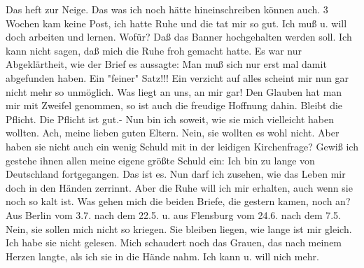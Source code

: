 \def\day{Canada, 27. August 1944}
\mktitle

Das heft zur Neige.
Das was ich noch h\"{a}tte hineinschreiben k\"{o}nnen auch.
3 Wochen kam keine Post, ich hatte Ruhe und die tat mir so gut.
Ich mu{\ss} u. will doch arbeiten und lernen.
Wof\"{u}r?
Da{\ss} das Banner hochgehalten werden soll.
Ich kann nicht sagen, da{\ss} mich die Ruhe froh gemacht hatte.
Es war nur Abgekl\"{a}rtheit, wie der Brief es aussagte: Man mu{\ss} sich nur erst mal damit abgefunden haben.
Ein "feiner" Satz!!!
Ein verzicht auf alles scheint mir nun gar nicht mehr so unm\"{o}glich.
Was liegt an uns, an mir gar!
Den Glauben hat man mir mit Zweifel genommen, so ist auch die freudige Hoffnung dahin.
Bleibt die Pflicht.
Die Pflicht ist gut.-
Nun bin ich soweit, wie sie mich vielleicht haben wollten.
Ach, meine lieben guten Eltern.
Nein, sie wollten es wohl nicht.
Aber haben sie nicht auch ein wenig Schuld mit in der leidigen Kirchenfrage?
Gewi{\ss} ich gestehe ihnen allen meine eigene gr\"{o}{\ss}te Schuld ein: Ich bin zu lange von Deutschland fortgegangen.
Das ist es.
Nun darf ich zusehen, wie das Leben mir doch in den H\"{a}nden zerrinnt.
Aber die Ruhe will ich mir erhalten, auch wenn sie noch so kalt ist.
Was gehen mich die beiden Briefe, die gestern kamen, noch an?
Aus Berlin vom 3.7. nach dem 22.5. u. aus Flensburg vom 24.6. nach dem 7.5.
Nein, sie sollen mich nicht so kriegen.
Sie bleiben liegen, wie lange ist mir gleich.
Ich habe sie nicht gelesen.
Mich schaudert noch das Grauen, das nach meinem Herzen langte, als ich sie in die H\"{a}nde nahm.
Ich kann u. will nich mehr.

\clearpage
